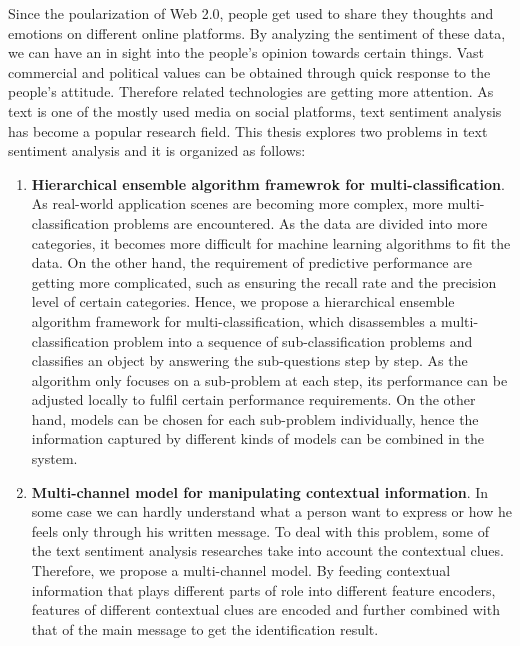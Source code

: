 \begin{eabstract}

Since the poularization of Web 2.0, people get used to share they thoughts and emotions on different online platforms. By analyzing the sentiment of these data, we can have an in sight into the people's opinion towards certain things. Vast commercial and political values can be obtained through quick response to the people's attitude. Therefore related technologies are getting more attention. As text is one of the mostly used media on social platforms, text sentiment analysis has become a popular research field. This thesis explores two problems in text sentiment analysis and it is organized as follows:

\begin{enumerate}

\item {\bf Hierarchical ensemble algorithm framewrok for multi-classification}. As real-world application scenes are becoming more complex, more multi-classification problems are encountered. As the data are divided into more categories, it becomes more difficult for machine learning algorithms to fit the data. On the other hand, the requirement of predictive performance are getting more complicated, such as ensuring the recall rate and the precision level of certain categories. Hence, we propose a hierarchical ensemble algorithm framework for multi-classification, which disassembles a multi-classification problem into a sequence of sub-classification problems and classifies an object by answering the sub-questions step by step. As the algorithm only focuses on a sub-problem at each step, its performance can be adjusted locally to fulfil certain performance requirements. On the other hand, models can be chosen for each sub-problem individually, hence the information captured by different kinds of models can be combined in the system.

\item {\bf Multi-channel model for manipulating contextual information}. In some case we can hardly understand what a person want to express or how he feels only through his written message. To deal with this problem, some of the text sentiment analysis researches take into account the contextual clues. Therefore, we propose a multi-channel model. By feeding contextual information that plays different parts of role into different feature encoders, features of different contextual clues are encoded and further combined with that of the main message to get the identification result.


\end{enumerate}
\end{eabstract}
